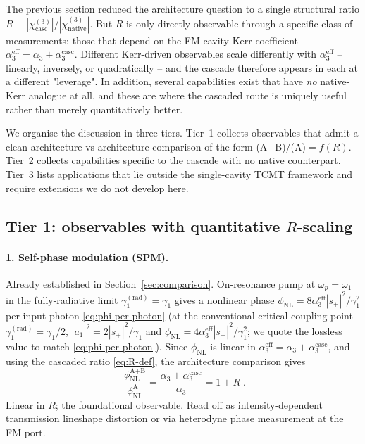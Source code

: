 \documentclass[11pt,a4paper]{article}
\newcommand{\chithree}{\chi^{(3)}}
\begin{document}
The previous section reduced the architecture question to a single
structural ratio
$R\equiv|\chithree_\text{casc}|/|\chithree_\text{native}|$.  But $R$
is only directly observable through a specific class of measurements:
those that depend on the FM-cavity Kerr coefficient
$\alpha_3^\text{eff}=\alpha_3+\alpha_3^\text{casc}$.  Different Kerr-driven
observables scale differently with $\alpha_3^\text{eff}$ -- linearly,
inversely, or quadratically -- and the cascade therefore appears in
each at a different "leverage".  In addition, several capabilities
exist that have \emph{no} native-Kerr analogue at all, and these are
where the cascaded route is uniquely useful rather than merely
quantitatively better.

We organise the discussion in three tiers.  Tier~1 collects
observables that admit a clean architecture-vs-architecture comparison
of the form (A+B)/(A)$=f(R)$.  Tier~2 collects capabilities specific
to the cascade with no native counterpart.  Tier~3 lists applications
that lie outside the single-cavity TCMT framework and require
extensions we do not develop here.

\subsection{Tier 1: observables with quantitative \texorpdfstring{$R$}{R}-scaling}

\paragraph{1. Self-phase modulation (SPM).}
Already established in Section~\ref{sec:comparison}.  On-resonance pump
at $\omega_p=\omega_1$ in the fully-radiative limit
$\gamma_1^{(\text{rad})}=\gamma_1$ gives a nonlinear phase
$\phi_\text{NL}=8\alpha_3^\text{eff}|s_+|^{2}/\gamma_1^{2}$ per input
photon \eqref{eq:phi-per-photon} (at the conventional critical-coupling
point $\gamma_1^{(\text{rad})}=\gamma_1/2$, $|a_1|^{2}=2|s_+|^{2}/\gamma_1$
and $\phi_\text{NL}=4\alpha_3^\text{eff}|s_+|^{2}/\gamma_1^{2}$; we
quote the lossless value to match \eqref{eq:phi-per-photon}).  Since $\phi_\text{NL}$ is linear
in $\alpha_3^\text{eff}=\alpha_3+\alpha_3^\text{casc}$, and using
the cascaded ratio \eqref{eq:R-def}, the architecture comparison gives
\begin{equation}
  \boxed{\;\frac{\phi_\text{NL}^{\text{A+B}}}{\phi_\text{NL}^{\text{A}}}
        =\frac{\alpha_3+\alpha_3^\text{casc}}{\alpha_3}
        =1+R\;.}
  \label{eq:SPM-ratio}
\end{equation}
Linear in $R$; the foundational observable.  Read off as
intensity-dependent transmission lineshape distortion or via
heterodyne phase measurement at the FM port.
\end{document}
